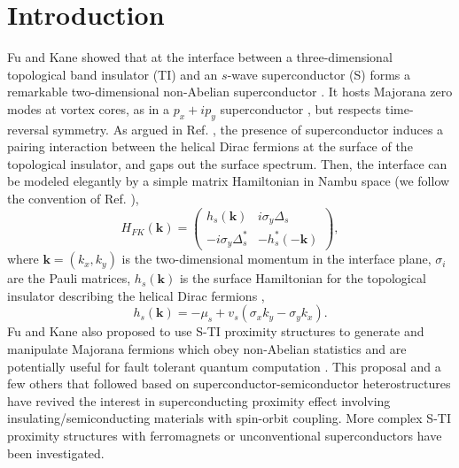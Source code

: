 \section{Introduction}
Fu and Kane showed that 
at the interface between a three-dimensional topological band insulator  (TI) and an 
$s$-wave superconductor (S) forms a remarkable two-dimensional non-Abelian superconductor \cite{f-k}.
It hosts Majorana zero modes at vortex cores, as in a 
$p_x+ip_y$ superconductor \cite{r-g}, but respects time-reversal symmetry. 
As argued in Ref. \cite{f-k}, the presence of superconductor induces a pairing interaction
between the helical Dirac fermions at the surface of the topological insulator,
and gaps out the surface spectrum. Then, the interface can be modeled elegantly by 
 a simple matrix Hamiltonian in Nambu space (we follow the convention of Ref. \cite{qi-zhang}),
\begin{equation}
H_{FK}(\mathbf{k})=\left(
\begin{array}{cc}
h_s(\mathbf{k})  &  i\sigma_y  \Delta_s \\
-i\sigma_y \Delta_s^*  &   -h_s^*(-\mathbf{k})
\end{array}\label{fkmodel}
\right),
\end{equation}
where $\mathbf{k}=(k_x,k_y)$ is the two-dimensional momentum in
the interface plane, $\sigma_i$ are the Pauli matrices,
$h_s(\mathbf{k})$ is the surface Hamiltonian
for the topological insulator describing the helical Dirac fermions \cite{qi-zhang,rmp},
\begin{equation}
h_s(\mathbf{k})=-\mu_s + v_s (\sigma_xk_y-\sigma_y k_x).
\end{equation}
Fu and Kane also proposed to use S-TI proximity structures to
generate and manipulate Majorana fermions which obey non-Abelian 
statistics and are potentially useful for fault tolerant quantum 
computation \cite{f-k}. 
This proposal and a few others that followed based on 
superconductor-semiconductor heterostructures \cite{roman,maryland,jason,mao1,mao2} have revived
the interest in superconducting proximity effect involving insulating/semiconducting 
materials with spin-orbit coupling. More complex S-TI proximity structures
with ferromagnets \cite{yu,jacF} or unconventional superconductors \cite{jacU} 
have been investigated.


